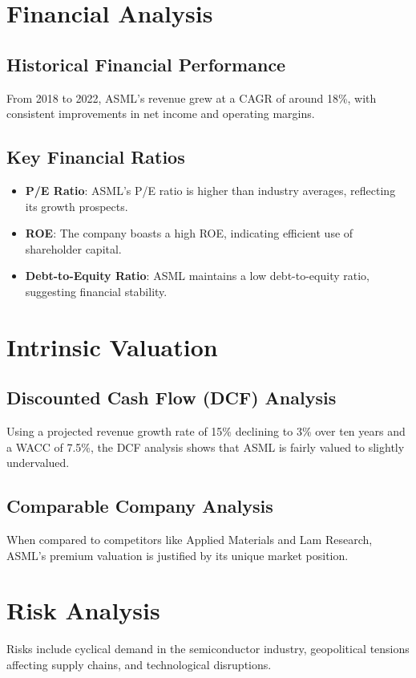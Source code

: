 \documentclass[12pt]{report}
\begin{document}
\section{Financial Analysis}
\subsection{Historical Financial Performance}
From 2018 to 2022, ASML's revenue grew at a CAGR of around 18\%, with consistent improvements in net income and operating margins.

\subsection{Key Financial Ratios}
\begin{itemize}
    \item \textbf{P/E Ratio}: ASML's P/E ratio is higher than industry averages, reflecting its growth prospects.
    \item \textbf{ROE}: The company boasts a high ROE, indicating efficient use of shareholder capital.
    \item \textbf{Debt-to-Equity Ratio}: ASML maintains a low debt-to-equity ratio, suggesting financial stability.
\end{itemize}

\section{Intrinsic Valuation}
\subsection{Discounted Cash Flow (DCF) Analysis}
Using a projected revenue growth rate of 15\% declining to 3\% over ten years and a WACC of 7.5\%, the DCF analysis shows that ASML is fairly valued to slightly undervalued.

\subsection{Comparable Company Analysis}
When compared to competitors like Applied Materials and Lam Research, ASML's premium valuation is justified by its unique market position.

\section{Risk Analysis}
Risks include cyclical demand in the semiconductor industry, geopolitical tensions affecting supply chains, and technological disruptions.
\end{document}
